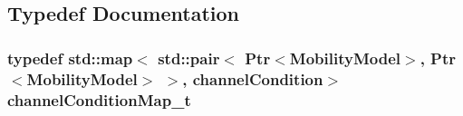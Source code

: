\subsection{Typedef Documentation}
\subsubsection[{\texorpdfstring{channel\+Condition\+Map\+\_\+t}{channelConditionMap_t}}]{\setlength{\rightskip}{0pt plus 5cm}typedef std\+::map$<$ std\+::pair$<$ {\bf Ptr}$<${\bf Mobility\+Model}$>$, {\bf Ptr}$<${\bf Mobility\+Model}$>$ $>$, {\bf channel\+Condition}$>$ {\bf channel\+Condition\+Map\+\_\+t}}\hypertarget{mmwave-3gpp-propagation-loss-model_8h_a76b21036afebb8764ee4bfe0aa80e806}{}\label{mmwave-3gpp-propagation-loss-model_8h_a76b21036afebb8764ee4bfe0aa80e806}
